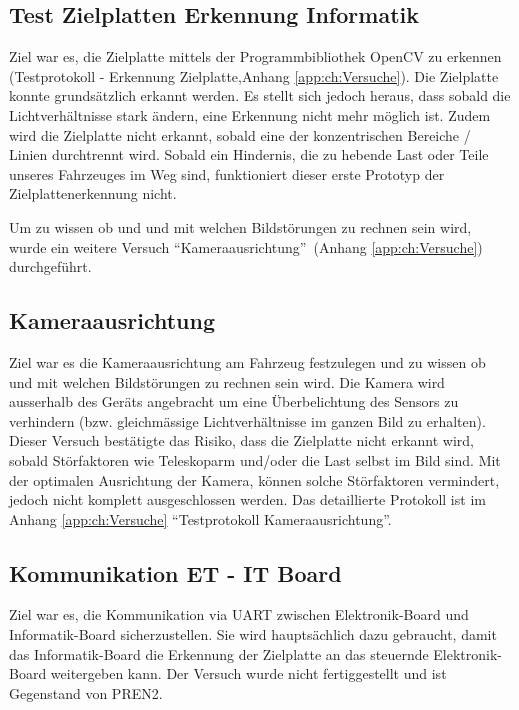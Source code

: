 \documentclass[a4paper]{report}
\begin{document}
\subsection{Test Zielplatten Erkennung Informatik}
\label{ssec:ZielplattenErkennung}
Ziel war es, die Zielplatte mittels der Programmbibliothek OpenCV zu erkennen (Testprotokoll - Erkennung Zielplatte,Anhang \ref{app:ch:Versuche}).
Die Zielplatte konnte grundsätzlich erkannt werden. Es stellt sich jedoch heraus, dass sobald die Lichtverhältnisse stark ändern, eine Erkennung nicht mehr möglich ist. Zudem wird die Zielplatte nicht erkannt, sobald eine der konzentrischen Bereiche / Linien durchtrennt wird. Sobald ein Hindernis, die zu hebende Last oder Teile unseres Fahrzeuges im Weg sind, funktioniert dieser erste Prototyp der Zielplattenerkennung nicht.

Um zu wissen ob und und mit welchen Bildstörungen zu rechnen sein wird, wurde ein weitere Versuch \textquotedblleft Kameraausrichtung\textquotedblright\ (Anhang \ref{app:ch:Versuche}) durchgeführt.

\subsection{Kameraausrichtung}
\label{ssec:VersKamera}
Ziel war es die Kameraausrichtung am Fahrzeug festzulegen und zu wissen ob und mit welchen Bildstörungen zu rechnen sein wird.
Die Kamera wird ausserhalb des Geräts angebracht um eine Überbelichtung des Sensors zu verhindern (bzw. gleichmässige Lichtverhältnisse im ganzen Bild zu erhalten).
Dieser Versuch bestätigte das Risiko, dass die Zielplatte nicht erkannt wird, sobald Störfaktoren wie Teleskoparm und/oder die Last selbst im Bild sind.  Mit der optimalen Ausrichtung der Kamera, können solche Störfaktoren vermindert, jedoch nicht komplett ausgeschlossen werden. Das detaillierte Protokoll ist im Anhang \ref{app:ch:Versuche}  \textquotedblleft Testprotokoll Kameraausrichtung\textquotedblright.

\subsection{Kommunikation ET - IT Board}
\label{ssec:VersKomm}
Ziel war es, die Kommunikation via UART zwischen Elektronik-Board und Informatik-Board sicherzustellen. Sie wird hauptsächlich dazu gebraucht, damit das Informatik-Board die Erkennung der Zielplatte an das steuernde Elektronik-Board weitergeben kann. Der Versuch wurde nicht fertiggestellt und ist Gegenstand von PREN2.
\end{document}
